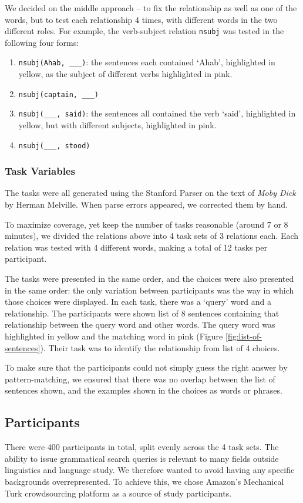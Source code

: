 \documentclass{sigchi}
\newcommand{\code}[1] {\texttt{#1}}
\begin{document}
We decided on the middle approach -- to fix the relationship as well as one of the words, but to test each relationship 4 times, with different words in the two different roles. For example, the verb-subject relation \code{nsubj} was tested in the following four forms:
\begin{enumerate}
	\item \code{nsubj(Ahab, \_\_\_)}:  the sentences each contained `Ahab', highlighted in yellow, as the subject of different verbs highlighted in pink.
	\item \code{nsubj(captain, \_\_\_)}

	\item \code{nsubj(\_\_\_, said)}: the sentences all contained the verb `said', highlighted in yellow, but with different subjects, highlighted in pink.
	\item \code{nsubj(\_\_\_, stood)}
\end{enumerate}

\subsubsection{Task Variables}

The tasks were all generated using the Stanford Parser on the text of \emph{Moby Dick} by Herman Melville. When parse errors appeared, we corrected them by hand.

To maximize coverage, yet keep the number of tasks reasonable (around 7 or 8 minutes), we divided the relations above into 4 task sets of 3 relations each. Each relation was tested with 4 different words, making a total of 12 tasks per participant.

The tasks were presented in the same order, and the choices were also presented in the same order: the only variation between participants was the way in which those choices were displayed. In each task, there was a `query' word and a relationship. The participants were shown list of 8 sentences containing that relationship between the query word and other words. The query word was highlighted in yellow and the matching word in pink (Figure \ref{fig:list-of-sentences}). Their task was to identify the relationship from list of 4 choices.  

To make sure that the participants could not simply guess the right answer by pattern-matching, we ensured that there was no overlap between the list of sentences shown, and the examples shown in the choices as words or phrases.


\subsection{Participants}
There were 400 participants in total, split evenly across the 4 task sets. The ability to issue grammatical search queries is relevant to many fields outside linguistics and language study. We therefore wanted to avoid having any specific backgrounds overrepresented. To achieve this, we chose Amazon's Mechanical Turk crowdsourcing platform as a source of study participants. 
\end{document}
